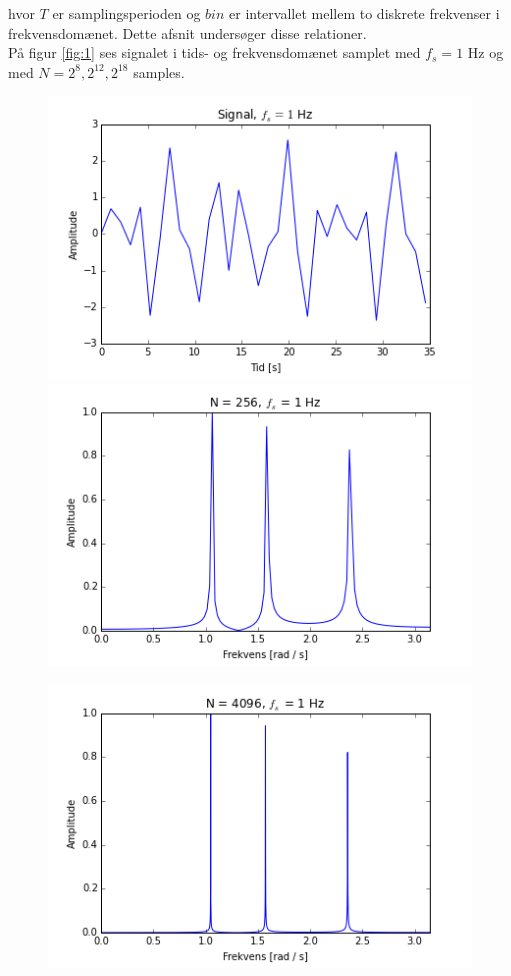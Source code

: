 hvor $T$ er samplingsperioden og $bin$ er intervallet mellem to diskrete frekvenser i frekvensdomænet. Dette afsnit undersøger disse relationer.\\
På figur \ref{fig:1} ses signalet i tids- og frekvensdomænet samplet med $f_s=1$ Hz og med $N=2^8, 2^{12}, 2^{18}$ samples.

\begin{figure}[H]
\begin{minipage}{0.49\textwidth}
\includegraphics[width=\textwidth]{figures/signal_1hz.png}
\includegraphics[width=\textwidth]{figures/frekvensanalyse/freq_1hz_N256}
\end{minipage}
\begin{minipage}{0.49\textwidth}
\includegraphics[width=\textwidth]{figures/frekvensanalyse/freq_1hz_N4096.png}

\end{minipage}
\end{figure}
